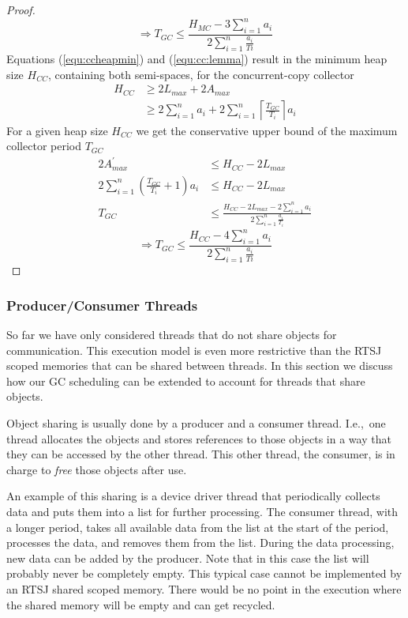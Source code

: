 \begin{proof}
\begin{equation}
    \Rightarrow T_{GC} \le \frac{H_{MC}-3\sum_{i=1}^{n} a_i}{2\sum_{i=1}^{n} \frac{a_i}{Ti}}
\end{equation}
%
Equations (\ref{equ:ccheapmin}) and (\ref{equ:cc:lemma}) result in
the minimum heap size $H_{CC}$, containing both semi-spaces, for the
concurrent-copy collector
\begin{align} \nonumber
    H_{CC} & \ge 2 L_{max} + 2 A_{max}\\
           & \ge 2\sum_{i=1}^{n} a_i + 2\sum_{i=1}^{n}
              \left\lceil\frac{T_{GC}}{T_i}\right\rceil a_i
\end{align}
%
For a given heap size $H_{CC}$ we get the conservative upper bound
of the maximum collector period $T_{GC}$
\begin{align}
\nonumber
        2 A^{'}_{max} & \le H_{CC} - 2L_{max}
\\
        2\sum_{i=1}^{n} \left(\frac{T_{GC}}{T_i}+1\right) a_i
        & \le H_{CC} - 2L_{max}
\\
        T_{GC}
        & \le \frac{H_{CC} - 2L_{max} - 2\sum_{i=1}^{n} a_i}
        {2\sum_{i=1}^{n} \frac{a_i}{T_i}}
\end{align}
%
\begin{equation}
    \Rightarrow T_{GC} \le \frac{H_{CC}-4\sum_{i=1}^{n} a_i}{2\sum_{i=1}^{n} \frac{a_i}{Ti}}
\end{equation}
\end{proof}

\subsubsection{Producer/Consumer Threads} \label{sec:prod:cons}

So far we have only considered threads that do not share objects for
communication. This execution model is even more restrictive than
the RTSJ scoped memories that can be shared between threads. In this
section we discuss how our GC scheduling can be extended to account
for threads that share objects.

Object sharing is usually done by a producer and a consumer thread.
I.e.,\ one thread allocates the objects and stores references to
those objects in a way that they can be accessed by the other
thread. This other thread, the consumer, is in charge to \emph{free}
those objects after use.

An example of this sharing is a device driver thread that
periodically collects data and puts them into a list for further
processing. The consumer thread, with a longer period, takes all
available data from the list at the start of the period, processes
the data, and removes them from the list. During the data processing,
new data can be added by the producer. Note that in this case the
list will probably never be completely empty. This typical case
cannot be implemented by an RTSJ shared scoped memory. There would be
no point in the execution where the shared memory will be empty and
can get recycled.

